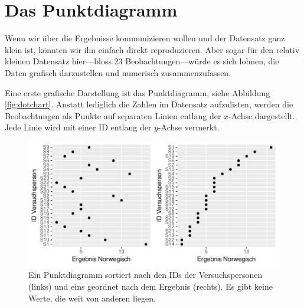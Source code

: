 \documentclass[oneside, 10pt]{book}\usepackage[]{graphicx}\usepackage[]{xcolor}
\newenvironment{knitrout}{}{} %
\begin{document}
\section{Das Punktdiagramm}
Wenn wir über die Ergebnisse kommunizieren wollen
und der Datensatz ganz klein ist, könnten wir
ihn einfach direkt reproduzieren. Aber sogar
für den relativ kleinen Datensatz hier---bloss 23
Beobachtungen---würde es sich lohnen, die
Daten grafisch darzustellen und numerisch
zusammenzufassen.

Eine erste grafische Darstellung
ist das Punktdiagramm,
siehe Abbildung \ref{fig:dotchart}. Anstatt
lediglich die Zahlen im Datensatz aufzulisten,
werden die Beobachtungen als Punkte
auf separaten Linien entlang der $x$-Achse dargestellt.
Jede Linie wird mit einer ID entlang der $y$-Achse vermerkt.
\begin{knitrout}
\color{fgcolor}\begin{figure}[tp]

{\centering \includegraphics[width=.8\textwidth]{figs/unnamed-chunk-78-1} 

}

\caption{Ein Punktdiagramm sortiert nach den IDs der Versuchspersonen (links) und eins geordnet nach dem Ergebnis (rechts). Es gibt keine Werte, die weit von anderen liegen.\label{fig:dotchart}}\label{fig:unnamed-chunk-78}
\end{figure}

\end{knitrout}
\end{document}
